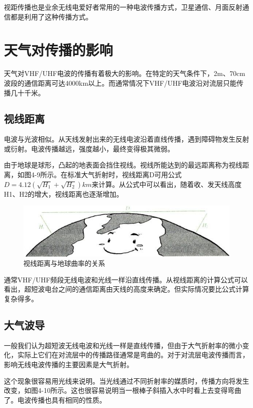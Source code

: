 \documentclass[12pt,UTF8]{ctexbook}
\begin{document}
视距传播也是业余无线电爱好者常用的一种电波传播方式，卫星通信、月面反射通信都是利用了这种传播方式。

\section{天气对传播的影响}

天气对VHF/UHF电波的传播有着极大的影响。在特定的天气条件下，2m、70cm波段的通信距离可达4000km以上。而通常情况下VHF/UHF电波沿对流层只能传播几十千米。

\subsection{视线距离}

电波与光波相似。从天线发射出来的无线电波沿着直线传播，遇到障碍物发生反射或衍射。电波传播越远，强度越小，最终变得极其微弱。

由于地球是球形，凸起的地表面会挡住视线。视线所能达到的最远距离称为视线距离，如图4-9所示。在标准大气折射时，视线距离D可用公式$ D = 4.12\left ( \sqrt{H_{1} } +  \sqrt{H_{2} } \right ) km $来计算。从公式中可以看出，随着收、发天线高度H1、H2的增大，视线距离也逐渐增加。

\begin{figure}[htbp]
	\centering
	\includegraphics[width=0.7\linewidth]{52}
	\caption{视线距离与地球曲率的关系}
	\label{fig:1}
\end{figure}

通常VHF/UHF频段无线电波和光线一样沿直线传播。从视线距离的计算公式可以看出，超短波电台之间的通信距离由天线的高度来确定。但实际情况要比公式计算复杂得多。

\subsection{大气波导}

一般我们认为超短波无线电波和光线一样是直线传播，但由于大气折射率的微小变化，实际上它们在对流层中的传播路径通常是弯曲的。对于对流层电波传播而言，影响无线电波传播的主要因素是大气折射。

这个现象很容易用光线来说明。当光线通过不同折射率的媒质时，传播方向将发生改变，如图4-10所示。这也很容易说明当一根棒子斜插入水中时看上去变得弯曲了。电波传播也具有相同的性质。
\end{document}

